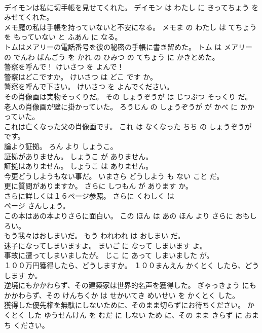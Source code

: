 \documentclass[8pt]{extreport}
\begin{document}
\begin{CJK}{UTF8}{min}
\\	デイモンは私に切手帳を見せてくれた。	デイモン は わたし に きってちょう を みせてくれた。	
\\	メモ魔の私は手帳を持っていないと不安になる。	メモま の わたし は てちょう を もっていない と ふあん に なる。	
\\	トムはメアリーの電話番号を彼の秘密の手帳に書き留めた。	トム は メアリー の でんわ ばんごう を かれ の ひみつ の てちょう に かきとめた。	
\\	警察を呼んで！	けいさつ を よんで！	
\\	警察はどこですか。	けいさつ は どこ です か。	
\\	警察を呼んで下さい。	けいさつ を よんでください。	
\\	その肖像画は実物そっくりだ。	その しょうぞうが は じつぶつ そっくり だ。	
\\	老人の肖像画が壁に掛かっていた。	ろうじん の しょうぞうが が かべ に かかっていた。	
\\	これは亡くなった父の肖像画です。	これ は なくなった ちち の しょうぞうが です。	
\\	論より証拠。	ろん より しょうこ。	
\\	証拠がありません。	しょうこ が ありません。	
\\	証拠はありません。	しょうこ は ありません。	
\\	今更どうしようもない事だ。	いまさら どうしよう も ない こと だ。	
\\	更に質問がありますか。	さらに しつもん が あります か。	
\\	さらに詳しくは１６ページ参照。	さらに くわしく は 
\\	ページ さんしょう。	
\\	この本はあの本よりさらに面白い。	この ほん は あの ほん より さらに おもしろい。	
\\	もう我々はおしまいだ。	もう われわれ は おしまい だ。	
\\	迷子になってしまいますよ。	まいご に なって しまいます よ。	
\\	事故に遭ってしまいましたが。	じこ に あって しまいました が。	
\\	１００万円獲得したら、どうしますか。	１００まんえん かくとく したら、どう します か。	
\\	逆境にもかかわらず、その建築家は世界的名声を獲得した。	ぎゃっきょう にも かかわらず、その けんちくか は せかいてき めいせい を かくとく した。	
\\	獲得した優先権を無駄にしないために、そのまま切らずにお待ちください。	かくとく した ゆうせんけん を むだ に しない ため に、その まま きらず に おまち ください。	

\end{CJK}
\end{document}
